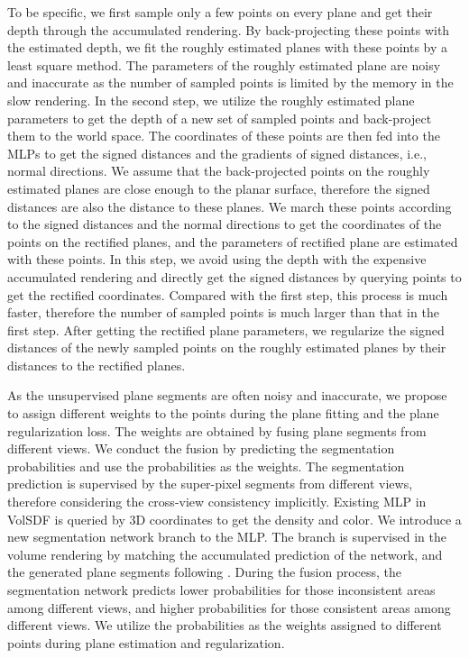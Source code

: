 \documentclass[10pt,journal,compsoc]{IEEEtran}
\begin{document}
	To be specific, we first sample only a few points on every plane and get their depth through the accumulated rendering. By back-projecting these points with the estimated depth, we fit the roughly estimated planes with these points by a least square method. The parameters of the roughly estimated plane are noisy and inaccurate as the number of sampled points is limited by the memory in the slow rendering. In the second step, we utilize the roughly estimated plane parameters to get the depth of a new set of sampled points and back-project them to the world space. The coordinates of these points are then fed into the MLPs to get the signed distances and the gradients of signed distances, i.e., normal directions. 
	We assume that the back-projected points on the roughly estimated planes are close enough to the planar surface, therefore the signed distances are also the distance to these planes. 
	We march these points according to the signed distances and the normal directions to get the coordinates of the points on the rectified planes, and the parameters of rectified plane are estimated with these points. In this step, we avoid using the depth with the expensive accumulated rendering and directly get the signed distances by querying points to get the rectified coordinates. Compared with the first step, this process is much faster, therefore the number of sampled points is much larger than that in the first step. After getting the rectified plane parameters, we regularize the signed distances of the newly sampled points on the roughly estimated planes by their distances to the rectified planes.
	
	As the unsupervised plane segments are often noisy and inaccurate, we propose to assign different weights to the points during the plane fitting and the plane regularization loss. The weights are obtained by fusing plane segments from different views. We conduct the fusion by predicting the segmentation probabilities and use the probabilities as the weights. The segmentation prediction is supervised by the super-pixel segments from different views, therefore considering the cross-view consistency implicitly. Existing MLP in VolSDF \cite{yariv2021volume} is queried by 3D coordinates to get the density and color. We introduce a new segmentation network branch to the MLP. The branch is supervised in the volume rendering by matching the accumulated prediction of the network, and the generated plane segments following \cite{carion2020end,wang2022dm}.
	During the fusion process, the segmentation network predicts lower probabilities for those inconsistent areas among different views, and higher probabilities for those consistent areas among different views. We utilize the probabilities as the weights assigned to different points during plane estimation and regularization.
	
\end{document}
